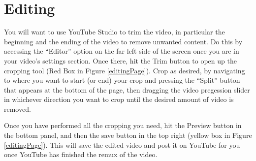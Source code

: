 \documentclass{article}
\begin{document}
    \newpage
    
    \section{Editing}
        
        You will want to use YouTube Studio to trim the video, in particular the beginning and the ending of the video to remove unwanted content. Do this by accessing the ``Editor'' option on the far left side of the screen once you are in your video's settings section. Once there, hit the Trim button to open up the cropping tool (Red Box in Figure \ref{editingPage}). Crop as desired, by navigating to where you want to start (or end) your crop and pressing the ``Split'' button that appears at the bottom of the page, then dragging the video pregession slider in whichever direction you want to crop until the desired amount of video is removed.
        
        Once you have performed all the cropping you need, hit the Preview button in the bottom panel, and then the save button in the top right (yellow box in Figure \ref{editingPage}). This will save the edited video and post it on YouTube for you once YouTube has finished the remux of the video.
\end{document}
